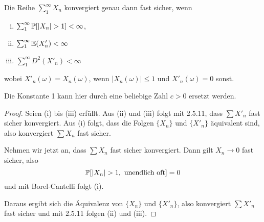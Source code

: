 \clearpage

\begin{thm}
  Die Reihe $\sum_1^\infty X_n$ konvergiert genau dann fast sicher, wenn
  \begin{enumerate}[(i)]
  \item $\sum_1^\infty \mathbb{P}[|X_n| > 1] < \infty$,
  \item $\sum_1^\infty \mathbb{E}(X'_n) < \infty$
  \item $\sum_1^\infty D^2(X'_n) < \infty$
  \end{enumerate}
  wobei $X'_n(\omega) = X_n(\omega)$, wenn $|X_n(\omega)| \le 1$ und
  $X'_n(\omega) = 0$ sonst.
\end{thm}

\begin{rmrk}
  Die Konstante 1 kann hier durch eine beliebige Zahl $c > 0$ ersetzt werden.
\end{rmrk}

\begin{proof}
  Seien (i) bis (iii) erfüllt. Aus (ii) und (iii) folgt mit 2.5.11, dass $\sum
  X'_n$ fast sicher konvergiert. Aus (i) folgt, dass die Folgen $\{X_n\}$ und
  $\{X'_n\}$ äquivalent sind, also konvergiert $\sum X_n$ fast sicher.

  Nehmen wir jetzt an, dass $\sum X_n$ fast sicher konvergiert. Dann gilt $X_n
  \to 0$ fast sicher, also
  \[ \mathbb{P}[ |X_n| > 1, \text{ unendlich oft}] = 0 \]
  und mit Borel-Cantelli folgt (i).

  Daraus ergibt sich die Äquivalenz von $\{X_n\}$ und $\{X'_n\}$, also
  konvergiert $\sum X'_n$ fast sicher und mit 2.5.11 folgen (ii) und (iii).
\end{proof}